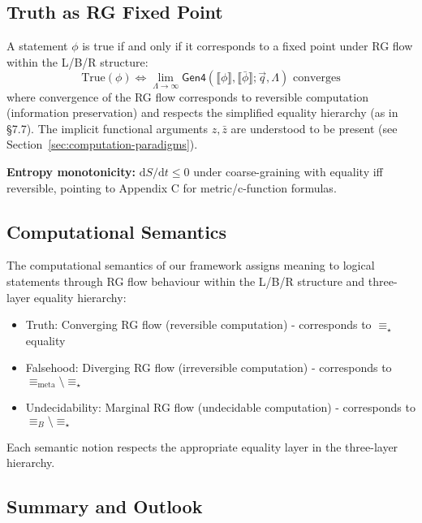 \subsection{Truth as RG Fixed Point}

\begin{theorem}
\label{thm:truth-rg-fixed-point-lbr}
A statement $\phi$ is true if and only if it corresponds to a fixed point under RG flow within the L/B/R structure:
\[
\text{True}(\phi) \Leftrightarrow \lim_{\Lambda \to \infty} \mathsf{Gen4}(\llbracket\phi\rrbracket, \llbracket\bar{\phi}\rrbracket; \vec{q}, \Lambda) \text{ converges}
\]
where convergence of the RG flow corresponds to reversible computation (information preservation) and respects the simplified equality hierarchy (as in §7.7). The implicit functional arguments $z, \bar{z}$ are understood to be present (see Section~\ref{sec:computation-paradigms}).

\textbf{Entropy monotonicity:} $\mathrm{d}S/\mathrm{d}t\le 0$ under coarse-graining with equality iff reversible, pointing to Appendix C for metric/c-function formulas.
\end{theorem}

\subsection{Computational Semantics}

\begin{definition}
\label{def:computational-semantics-lbr}
The computational semantics of our framework assigns meaning to logical statements through RG flow behaviour within the L/B/R structure and three-layer equality hierarchy:
\begin{itemize}
\item Truth: Converging RG flow (reversible computation) - corresponds to $\equiv_\star$ equality
\item Falsehood: Diverging RG flow (irreversible computation) - corresponds to $\equiv_{\text{meta}} \setminus \equiv_\star$
\item Undecidability: Marginal RG flow (undecidable computation) - corresponds to $\equiv_B \setminus \equiv_\star$
\end{itemize}
Each semantic notion respects the appropriate equality layer in the three-layer hierarchy.
\end{definition}

\subsection{Summary and Outlook}

